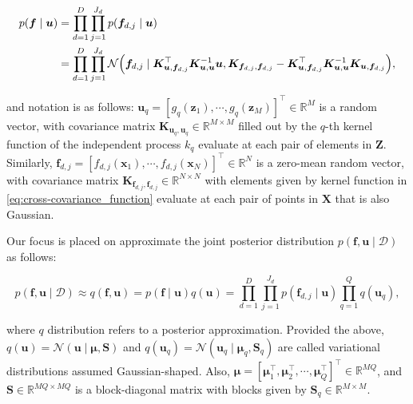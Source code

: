 \begin{equation}\label{eq:conditional_f_given_u}
	\begin{split}
		p(\boldsymbol{f}\mid \boldsymbol{u})
		&= \prod_{d=1}^{D}\prod_{j=1}^{J_{d}}
		p(\boldsymbol{f}_{d,j}\mid \boldsymbol{u})\\
		&= \prod_{d=1}^{D}\prod_{j=1}^{J_{d}}
		\mathcal{N}\Bigl(
		\boldsymbol{f}_{d,j} \mid
		\boldsymbol{K}_{\boldsymbol{u}, \boldsymbol{f}_{d,j}}^{\top}
		\boldsymbol{K}_{\boldsymbol{u},\boldsymbol{u}}^{-1}
		\boldsymbol{u},
		\boldsymbol{K}_{\boldsymbol{f}_{d,j}, \boldsymbol{f}_{d,j}} -
		\boldsymbol{K}_{\boldsymbol{u}, \boldsymbol{f}_{d,j}}^{\top}
		\boldsymbol{K}_{\boldsymbol{u},\boldsymbol{u}}^{-1}
		\boldsymbol{K}_{\boldsymbol{u}, \boldsymbol{f}_{d,j}}
		\Bigr) ,
	\end{split}
\end{equation}

and notation is as follows: \( \boldsymbol{u}_q = [g_q(\boldsymbol{z}_1), \cdots, g_q(\boldsymbol{z}_M)  ]^\top \in \mathbb{R}^{M} \) is a random vector, with covariance matrix \(  \boldsymbol{K}_{\boldsymbol{u}_q,\boldsymbol{u}_q} \in \mathbb{R}^{M \times M} \) filled out by the \( q \)-th kernel function of the independent process \( k_q \) evaluate at each pair of elements in \( \boldsymbol{Z} \). Similarly, \( \boldsymbol{f}_{d,j} = [f_{d,j}(\boldsymbol{x}_1), \cdots, f_{d,j}(\boldsymbol{x}_N) ]^\top \in \mathbb{R}^{N} \) is a zero-mean random vector, with covariance matrix \(  \boldsymbol{K}_{\boldsymbol{f}_{d,j},\boldsymbol{f}_{d,j}} \in \mathbb{R}^{N \times N} \) with elements given by kernel function in \cref{eq:cross-covariance_function} evaluate at each pair of points in \( \boldsymbol{X} \) that is also Gaussian. 


Our focus is placed on approximate the joint posterior distribution $p(\boldsymbol{f}, \boldsymbol{u} \mid \mathcal{D})$ as follows:

\begin{equation}
	p(\boldsymbol{f}, \boldsymbol{u} \mid \mathcal{D}) \approx q(\boldsymbol{f}, \boldsymbol{u}) = p(\boldsymbol{f}\mid \boldsymbol{u}) q(\boldsymbol{u}) = \prod_{d=1}^D \prod_{j=1}^{J_d} p(\boldsymbol{f}_{d,j} \mid \boldsymbol{u}) \prod_{q=1}^Q q(\boldsymbol{u}_q),
\end{equation}

where \( q \) distribution refers to a posterior approximation. Provided the above, \( q(\boldsymbol{u}) = \mathcal{N}(\boldsymbol{u} \mid \boldsymbol{\mu}, \boldsymbol{S}) \) and \( q(\boldsymbol{u}_q) = \mathcal{N}(\boldsymbol{u}_q \mid \boldsymbol{\mu}_{q}, \boldsymbol{S}_{q}) \) are called variational distributions assumed Gaussian-shaped. Also, \( \boldsymbol{\mu} = [\boldsymbol{\mu}_1^\top, \boldsymbol{\mu}_2^\top, \cdots, \boldsymbol{\mu}_Q^\top]^\top \in \mathbb{R}^{MQ} \), and \( \boldsymbol{S} \in \mathbb{R}^{MQ \times MQ} \) is a block-diagonal matrix with blocks given by \( \boldsymbol{S}_q \in \mathbb{R}^{M \times M} \).

